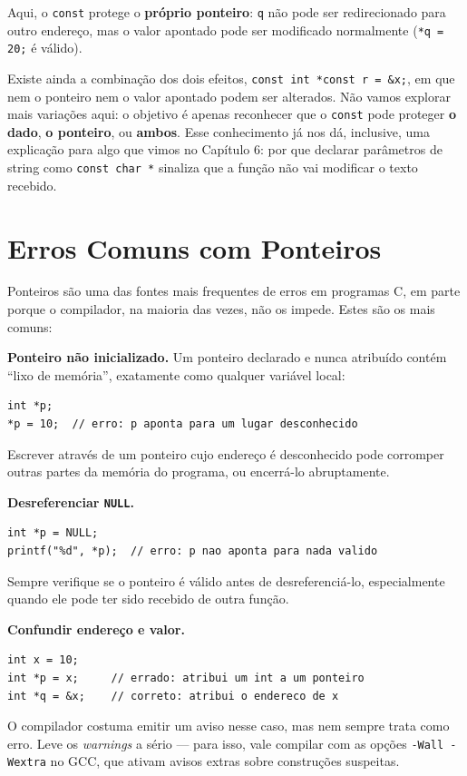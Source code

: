 Aqui, o \texttt{const} protege o \textbf{próprio ponteiro}: \texttt{q} não pode ser redirecionado para outro endereço, mas o valor apontado pode ser modificado normalmente (\texttt{*q = 20;} é válido).

Existe ainda a combinação dos dois efeitos, \texttt{const int *const r = \&x;}, em que nem o ponteiro nem o valor apontado podem ser alterados. Não vamos explorar mais variações aqui: o objetivo é apenas reconhecer que o \texttt{const} pode proteger \textbf{o dado}, \textbf{o ponteiro}, ou \textbf{ambos}. Esse conhecimento já nos dá, inclusive, uma explicação para algo que vimos no Capítulo 6: por que declarar parâmetros de string como \texttt{const char *} sinaliza que a função não vai modificar o texto recebido.

\section{Erros Comuns com Ponteiros}

Ponteiros são uma das fontes mais frequentes de erros em programas C, em parte porque o compilador, na maioria das vezes, não os impede. Estes são os mais comuns:

\begin{errocomum}
\textbf{Ponteiro não inicializado.} Um ponteiro declarado e nunca atribuído contém ``lixo de memória'', exatamente como qualquer variável local:
\begin{lstlisting}
int *p;
*p = 10;  // erro: p aponta para um lugar desconhecido
\end{lstlisting}
Escrever através de um ponteiro cujo endereço é desconhecido pode corromper outras partes da memória do programa, ou encerrá-lo abruptamente.
\end{errocomum}

\begin{errocomum}
\textbf{Desreferenciar \texttt{NULL}.}
\begin{lstlisting}
int *p = NULL;
printf("%d", *p);  // erro: p nao aponta para nada valido
\end{lstlisting}
Sempre verifique se o ponteiro é válido antes de desreferenciá-lo, especialmente quando ele pode ter sido recebido de outra função.
\end{errocomum}

\begin{errocomum}
\textbf{Confundir endereço e valor.}
\begin{lstlisting}
int x = 10;
int *p = x;     // errado: atribui um int a um ponteiro
int *q = &x;    // correto: atribui o endereco de x
\end{lstlisting}
O compilador costuma emitir um aviso nesse caso, mas nem sempre trata como erro. Leve os \textit{warnings} a sério — para isso, vale compilar com as opções \texttt{-Wall -Wextra} no GCC, que ativam avisos extras sobre construções suspeitas.
\end{errocomum}

